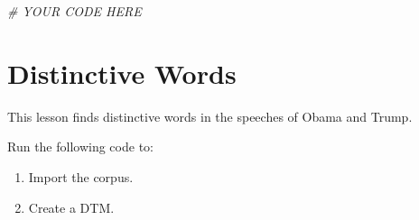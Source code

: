 \documentclass[]{book}
\newenvironment{Shaded}{\begin{snugshade}}{\end{snugshade}}
\newcommand{\CommentTok}[1]{\textcolor[rgb]{0.56,0.35,0.01}{\textit{#1}}}
\providecommand{\tightlist}{%
  \setlength{\itemsep}{0pt}\setlength{\parskip}{0pt}}
\begin{document}
\begin{Shaded}
\begin{Highlighting}[]
\CommentTok{# YOUR CODE HERE}
\end{Highlighting}
\end{Shaded}

\section{Distinctive Words}\label{distinctive-words}

This lesson finds distinctive words in the speeches of Obama and Trump.

Run the following code to:

\begin{enumerate}
\def\labelenumi{\arabic{enumi}.}
\tightlist
\item
  Import the corpus.
\item
  Create a DTM.
\end{enumerate}
\end{document}
